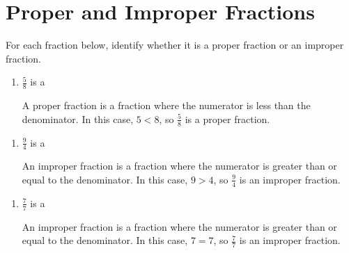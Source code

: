 \documentclass{ximera}
\begin{document}

\section*{Proper and Improper Fractions}

For each fraction below, identify whether it is a proper fraction or an improper fraction.

\begin{problem}
\begin{enumerate}
    \item $\frac{5}{8}$ is a 
\begin{feedback}
A proper fraction is a fraction where the numerator is less than the denominator. In this case, $5 < 8$, so $\frac{5}{8}$ is a proper fraction.
\end{feedback}

\end{enumerate}
\end{problem}

\begin{problem}
\begin{enumerate}
    \item $\frac{9}{4}$ is a 
\begin{feedback}
An improper fraction is a fraction where the numerator is greater than or equal to the denominator. In this case, $9 > 4$, so $\frac{9}{4}$ is an improper fraction.
\end{feedback}

\end{enumerate}
\end{problem}

\begin{problem}
\begin{enumerate}
    \item $\frac{7}{7}$ is a 
\begin{feedback}
An improper fraction is a fraction where the numerator is greater than or equal to the denominator. In this case, $7 = 7$, so $\frac{7}{7}$ is an improper fraction.
\end{feedback}

\end{enumerate}
\end{problem}
\end{document}
